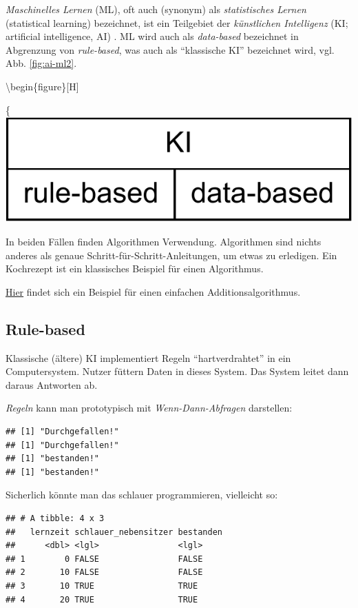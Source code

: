 \documentclass[
]{book}
\begin{document}
\emph{Maschinelles Lernen} (ML), oft auch (synonym) als \emph{statistisches Lernen} (statistical learning) bezeichnet, ist ein Teilgebiet der \emph{künstlichen Intelligenz} (KI; artificial intelligence, AI) \citep{rhys}. ML wird auch als \emph{data-based} bezeichnet in Abgrenzung von \emph{rule-based}, was auch als ``klassische KI'' bezeichnet wird, vgl. Abb. \ref{fig:ai-ml2}.

\textbackslash begin\{figure\}{[}H{]}

\{\centering \includegraphics[width=0.5\linewidth]{chunk-img/ai-ml2-1}

In beiden Fällen finden Algorithmen Verwendung.
Algorithmen sind nichts anderes als genaue Schritt-für-Schritt-Anleitungen, um etwas zu erledigen.
Ein Kochrezept ist ein klassisches Beispiel für einen Algorithmus.

\href{https://www.c-programming-simple-steps.com/images/xsum-two-numbers-h.png.pagespeed.ic.AM9WYFPgEo.webp}{Hier} findet sich ein Beispiel für einen einfachen Additionsalgorithmus.

\hypertarget{rule-based}{%
\subsection{Rule-based}\label{rule-based}}

Klassische (ältere) KI implementiert Regeln ``hartverdrahtet'' in ein Computersystem.
Nutzer füttern Daten in dieses System. Das System leitet dann daraus Antworten ab.

\emph{Regeln} kann man prototypisch mit \emph{Wenn-Dann-Abfragen} darstellen:

\begin{verbatim}
## [1] "Durchgefallen!"
## [1] "Durchgefallen!"
## [1] "bestanden!"
## [1] "bestanden!"
\end{verbatim}

Sicherlich könnte man das schlauer programmieren, vielleicht so:

\begin{verbatim}
## # A tibble: 4 x 3
##   lernzeit schlauer_nebensitzer bestanden
##      <dbl> <lgl>                <lgl>    
## 1        0 FALSE                FALSE    
## 2       10 FALSE                FALSE    
## 3       10 TRUE                 TRUE     
## 4       20 TRUE                 TRUE
\end{verbatim}
\end{document}
